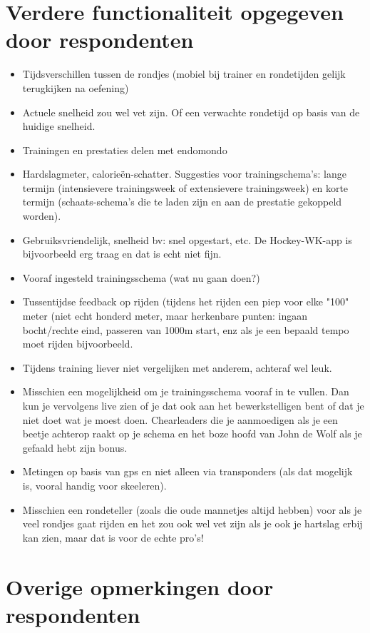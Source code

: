 \section*{Verdere functionaliteit opgegeven door respondenten}
\begin{itemize}
\item Tijdsverschillen tussen de rondjes (mobiel bij trainer en rondetijden gelijk terugkijken na oefening)
\item Actuele snelheid zou wel vet zijn. Of een verwachte rondetijd op basis van de huidige snelheid.
\item Trainingen en prestaties delen met endomondo
\item Hardslagmeter, calorieën-schatter. Suggesties voor trainingschema's: lange termijn (intensievere trainingsweek of extensievere trainingsweek) en korte termijn (schaats-schema's die te laden zijn en aan de prestatie gekoppeld worden).
\item Gebruiksvriendelijk, snelheid bv: snel opgestart, etc. De Hockey-WK-app is bijvoorbeeld erg traag en dat is echt niet fijn.
\item Vooraf ingesteld trainingsschema (wat nu gaan doen?) \item Tussentijdse feedback op rijden (tijdens het rijden een piep voor elke "100" meter (niet echt honderd meter, maar herkenbare punten: ingaan bocht/rechte eind, passeren van 1000m start, enz als je een bepaald tempo moet rijden bijvoorbeeld.
\item Tijdens training liever niet vergelijken met anderem, achteraf wel leuk.
\item Misschien een mogelijkheid om je trainingsschema vooraf in te vullen. Dan kun je vervolgens live zien of je dat ook aan het bewerkstelligen bent of dat je niet doet wat je moest doen. Chearleaders die je aanmoedigen als je een beetje achterop raakt op je schema en het boze hoofd van John de Wolf als je gefaald hebt zijn bonus.
\item Metingen op basis van gps en niet alleen via transponders (als dat mogelijk is, vooral handig voor skeeleren).
\item Misschien een rondeteller (zoals die oude mannetjes altijd hebben) voor als je veel rondjes gaat rijden en het zou ook wel vet zijn als je ook je hartslag erbij kan zien, maar dat is voor de echte pro's!
\end{itemize}

\section*{Overige opmerkingen door respondenten}

